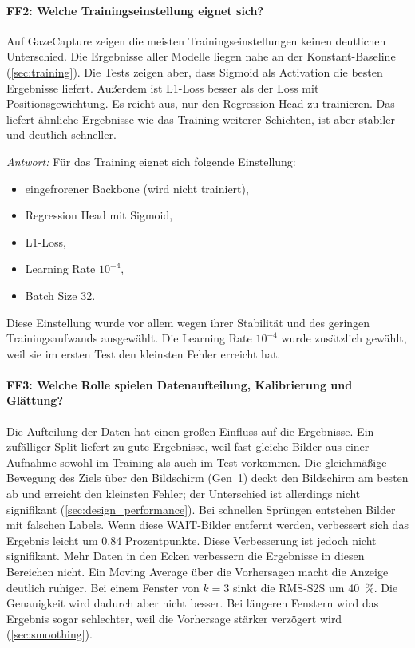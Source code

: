 \paragraph{FF2: Welche Trainingseinstellung eignet sich?}
Auf GazeCapture zeigen die meisten Trainingseinstellungen keinen deutlichen
Unterschied. Die Ergebnisse aller Modelle liegen nahe an der Konstant-Baseline
(\cref{sec:training}). Die Tests zeigen aber, dass Sigmoid als Activation die
besten Ergebnisse liefert. Außerdem ist L1-Loss besser als der Loss mit
Positionsgewichtung. Es reicht aus, nur den Regression Head zu trainieren. Das
liefert ähnliche Ergebnisse wie das Training weiterer Schichten, ist aber
stabiler und deutlich schneller.

\emph{Antwort:} Für das Training eignet sich folgende Einstellung:
\begin{itemize}[nosep]
  \item eingefrorener Backbone (wird nicht trainiert),
  \item Regression Head mit Sigmoid,
  \item L1-Loss,
  \item Learning Rate $10^{-4}$,
  \item Batch Size 32.
\end{itemize}
Diese Einstellung wurde vor allem wegen ihrer Stabilität und des geringen
Trainingsaufwands ausgewählt. Die Learning Rate $10^{-4}$ wurde zusätzlich
gewählt, weil sie im ersten Test den kleinsten Fehler erreicht hat.

\paragraph{FF3: Welche Rolle spielen Datenaufteilung, Kalibrierung und Glättung?}
Die Aufteilung der Daten hat einen großen Einfluss auf die Ergebnisse. Ein
zufälliger Split liefert zu gute Ergebnisse, weil fast gleiche Bilder aus einer
Aufnahme sowohl im Training als auch im Test vorkommen. Die gleichmäßige
Bewegung des Ziels über den Bildschirm (Gen~1) deckt den Bildschirm am besten
ab und erreicht den kleinsten Fehler; der Unterschied ist allerdings nicht
signifikant (\cref{sec:design_performance}). Bei schnellen Sprüngen entstehen
Bilder mit falschen Labels. Wenn diese WAIT-Bilder entfernt werden, verbessert
sich das Ergebnis leicht um \num{0,84} Prozentpunkte. Diese Verbesserung ist
jedoch nicht signifikant. Mehr Daten in den Ecken verbessern die Ergebnisse in
diesen Bereichen nicht. Ein Moving Average über die Vorhersagen macht die
Anzeige deutlich ruhiger. Bei einem Fenster von $k=3$ sinkt die RMS-S2S um
\SI{40}{\percent}. Die Genauigkeit wird dadurch aber nicht besser. Bei längeren
Fenstern wird das Ergebnis sogar schlechter, weil die Vorhersage stärker
verzögert wird (\cref{sec:smoothing}).

